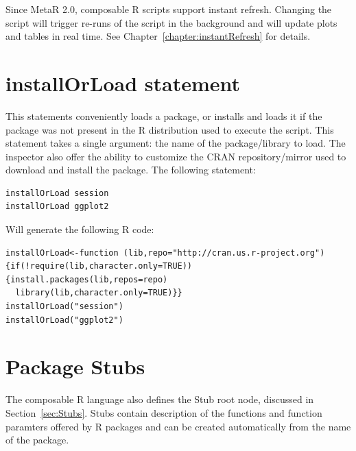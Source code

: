 Since MetaR 2.0, composable R scripts support instant refresh. Changing the script will trigger re-runs of the script in the background and will update plots and tables in real time. See Chapter~\ref{chapter:instantRefresh} for details. 
\section{installOrLoad statement}
This statements conveniently loads a package, or installs and loads it if the package was not present in the R distribution used to execute the script. This statement takes a single argument: the name of the package/library to load. The inspector also offer the ability to customize the CRAN repository/mirror used to download and install  the package. 
The following statement:
\begin{lstlisting}
installOrLoad session
installOrLoad ggplot2
\end{lstlisting}
Will generate the following R code:

\begin{lstlisting}
installOrLoad<-function (lib,repo="http://cran.us.r-project.org"){if(!require(lib,character.only=TRUE)){install.packages(lib,repos=repo)
  library(lib,character.only=TRUE)}}
installOrLoad("session")
installOrLoad("ggplot2")
\end{lstlisting}

\section{Package Stubs}
The composable R language also defines the Stub root node, discussed in Section~\ref{sec:Stubs}. Stubs contain description of the functions and function paramters offered by R packages and can be created automatically from the name of the package.




